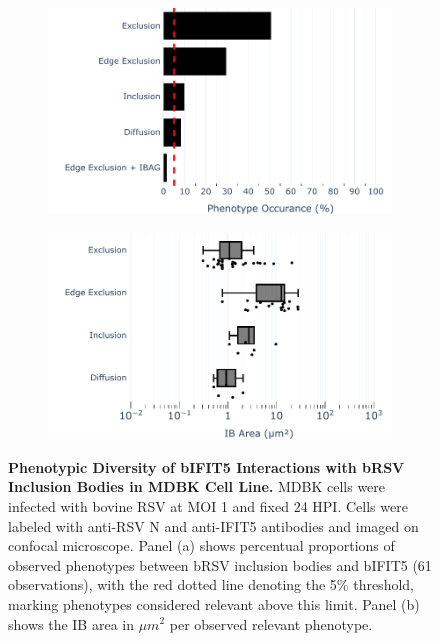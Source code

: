 \begin{figure}
    \begin{subfigure}{0.495\textwidth}
        \caption{}
        \includegraphics[width=1\linewidth]{08. Chapter 3/Figs/02. Infection/04. IFIT5/07. bar_i5_mdbk.pdf} 
    \end{subfigure}
    \begin{subfigure}{0.495\textwidth}
        \caption{}
        \includegraphics[width=1\linewidth]{08. Chapter 3/Figs/02. Infection/04. IFIT5/08. box_i5_mdbk.pdf}
    \end{subfigure}
    \caption[Phenotypic Diversity of bIFIT5 Interactions with bRSV Inclusion Bodies in MDBK Cell Line.]{\textbf{Phenotypic Diversity of bIFIT5 Interactions with bRSV Inclusion Bodies in MDBK Cell Line.} MDBK cells were infected with bovine RSV at MOI 1 and fixed 24 HPI. Cells were labeled with anti-RSV N and anti-IFIT5 antibodies and imaged on confocal microscope. Panel (a) shows percentual proportions of observed phenotypes between bRSV inclusion bodies and bIFIT5 (61 observations), with the red dotted line denoting the 5\% threshold, marking phenotypes considered relevant above this limit. Panel (b) shows the IB area in \(\mu m^2\) per observed relevant phenotype.}
    \label{fig:Phenotypic Diversity of bIFIT5 Interactions with bRSV Inclusion Bodies in MDBK Cell Line}
\end{figure}

